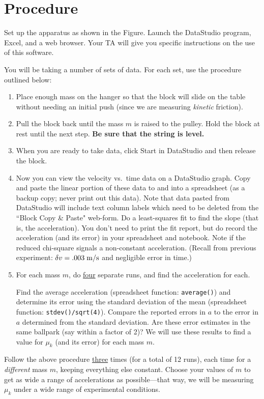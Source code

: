 \section*{Procedure}
Set up the apparatus as shown in the Figure.  Launch the DataStudio program,
Excel, and a web browser.
Your TA
will give you specific instructions on the use of this software.

You will be taking a number of sets of data.  For each set, use the
procedure outlined below:

\begin{enumerate}
%
\item Place enough mass on the hanger so that the block will slide
on the table without needing an initial push (since we are measuring
{\em kinetic} friction).
%
\item Pull the block back until the mass $m$ is raised to the pulley.
Hold the block at rest until the next step.   {\bf Be sure that the string
is level.}
%
\item  When you are ready to take data, click Start in DataStudio and then release the block.
%
\item Now you can view the velocity vs.\ time data on a
DataStudio graph.  Copy and paste the linear portion of these data
to \WAPP and into a spreadsheet (as a backup copy; never print out
this data). Note that data pasted from DataStudio will include
text column labels which need to be deleted from the \WAPP ``Block Copy \& Paste"
web-form. Do a least-squares fit to find
the slope (that is, the acceleration).  You don't need to print the
fit report, but do record the acceleration (and its error) in your spreadsheet and notebook.
Note if the reduced chi-square signals a non-constant acceleration.
(Recall from previous experiment: $\delta v = .003\; {\rm m/s}$ and negligible error in time.)
%
\item For each mass $m$, do \underline{four} separate runs, and find the
acceleration for each.  

Find the average acceleration (spreadsheet function: {\tt average()}) and determine
its error using the standard deviation of the mean (spreadsheet function: {\tt stdev()/sqrt(4)}). Compare the
\WAPP reported errors in $a$ to the error in $a$ determined from
the standard deviation.  Are these error estimates
in the same ballpark (say within a factor of 2)? We will
use these results to find a value for $\mu_k$ (and its error)
for each mass $m$.  
%
\end{enumerate}
Follow the above procedure \underline{three} times
(for a total of 12 runs), each
time for a {\em different} mass $m$, keeping everything else constant.
Choose your values of $m$ to get
as wide a range of accelerations as possible---that way, we will be
measuring $\mu_k$ under a wide range of experimental conditions.
%

